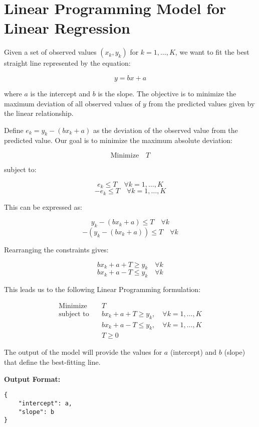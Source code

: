 \documentclass{article}
\begin{document}
\section*{Linear Programming Model for Linear Regression}

Given a set of observed values \( (x_k, y_k) \) for \( k = 1, \ldots, K \), we want to fit the best straight line represented by the equation:

\[
y = bx + a
\]

where \( a \) is the intercept and \( b \) is the slope. The objective is to minimize the maximum deviation of all observed values of \( y \) from the predicted values given by the linear relationship.

Define \( e_k = y_k - (bx_k + a) \) as the deviation of the observed value from the predicted value. Our goal is to minimize the maximum absolute deviation:

\[
\text{Minimize} \quad T
\]

subject to:

\[
e_k \leq T \quad \forall k = 1, \ldots, K
\]
\[
-e_k \leq T \quad \forall k = 1, \ldots, K
\]

This can be expressed as:

\[
y_k - (bx_k + a) \leq T \quad \forall k
\]
\[
-(y_k - (bx_k + a)) \leq T \quad \forall k
\]

Rearranging the constraints gives:

\[
bx_k + a + T \geq y_k \quad \forall k
\]
\[
bx_k + a - T \leq y_k \quad \forall k
\]

This leads us to the following Linear Programming formulation:

\begin{align*}
\text{Minimize} \quad & T \\
\text{subject to} \quad & bx_k + a + T \geq y_k, \quad \forall k = 1, \ldots, K \\
& bx_k + a - T \leq y_k, \quad \forall k = 1, \ldots, K \\
& T \geq 0
\end{align*}

The output of the model will provide the values for \( a \) (intercept) and \( b \) (slope) that define the best-fitting line.

\textbf{Output Format:}
\begin{verbatim}
{
    "intercept": a,
    "slope": b
}
\end{verbatim}
\end{document}
